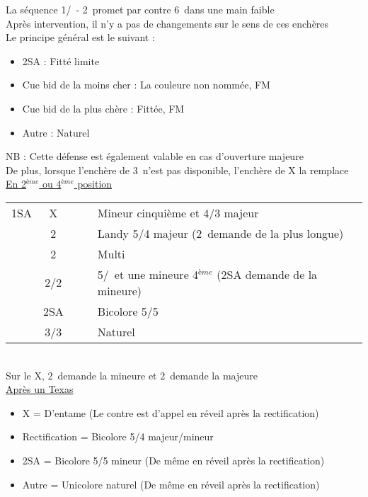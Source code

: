 \documentclass[a4paper, oneside, 11pt]{report}
\begin{document}
		La séquence 1\trefle/\carreau\ - 2\pique\ promet par contre 6\pique\ dans une main faible\\
		
		Après intervention, il n'y a pas de changements sur le sens de ces enchères\\
		
		Le principe général est le suivant :
		\begin{itemize}
		\item 2SA : Fitté limite
		\item Cue bid de la moins cher : La couleure non nommée, FM
		\item Cue bid de la plus chère : Fittée, FM
		\item Autre : Naturel
		\end{itemize}
	
		NB : Cette défense est également valable en cas d'ouverture majeure\\
		De plus, lorsque l'enchère de 3\trefle\ n'est pas disponible, l'enchère de X la remplace\\
	
	\underline{En 2$^{ème}$ ou 4$^{ème}$ position}
	
	\begin{tabular}{cccc|l}
	1SA & X &&& Mineur cinquième et 4/3 majeur\\
	& 2\trefle &&& Landy 5/4 majeur (2\carreau\ demande de la plus longue)\\
	& 2\carreau &&& Multi\\
	& 2\coeur/2\pique &&& 5\coeur/\pique\ et une mineure 4$^{ème}$ (2SA demande de la mineure)\\
	& 2SA &&& Bicolore 5\trefle/5\carreau\\
	& 3\trefle/3\carreau &&& Naturel\\
	\end{tabular}\\
	Sur le X, 2\trefle\ demande la mineure et 2\carreau\ demande la majeure\\

	\underline{Après un Texas}
	
	\begin{itemize}
	\item X = D'entame (Le contre est d'appel en réveil après la rectification)
	\item Rectification = Bicolore 5/4 majeur/mineur
	\item 2SA = Bicolore 5/5 mineur (De même en réveil après la rectification)
	\item Autre = Unicolore naturel (De même en réveil après la rectification)\\
	\end{itemize}
\end{document}
